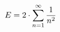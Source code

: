 \documentclass[preview]{standalone}
\begin{document}
\begin{align*}
\special{dvisvgm:raw <g id='unique000'>}E = 2 \cdot \sum_{n=1}^{\infty} \frac{1}{n^2}\special{dvisvgm:raw </g>}
\end{align*}
\end{document}
